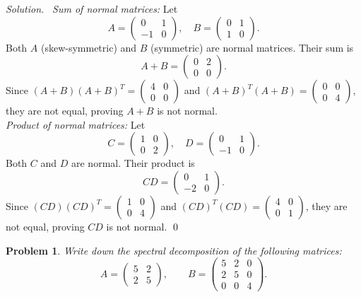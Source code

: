\documentclass[12pt,a4paper]{article}
\newenvironment{solution}{%
  \par\noindent\textit{Solution.}\ }{\qed}
\theoremstyle{problemstyle}
\newtheorem{problem}{Problem}[section]
\begin{document}
\begin{solution}
    \textit{Sum of normal matrices:} Let
\[ A = \begin{pmatrix} 0 & 1 \\ -1 & 0 \end{pmatrix}, \quad B = \begin{pmatrix} 0 & 1 \\ 1 & 0 \end{pmatrix}. \]
Both $A$ (skew-symmetric) and $B$ (symmetric) are normal matrices. Their sum is
\[ A+B = \begin{pmatrix} 0 & 2 \\ 0 & 0 \end{pmatrix}. \]
Since $(A+B)(A+B)^T = \begin{pmatrix} 4 & 0 \\ 0 & 0 \end{pmatrix}$ and $(A+B)^T(A+B) = \begin{pmatrix} 0 & 0 \\ 0 & 4 \end{pmatrix}$, they are not equal, proving $A+B$ is not normal.
\\ \textit{Product of normal matrices:} Let
\[ C = \begin{pmatrix} 1 & 0 \\ 0 & 2 \end{pmatrix}, \quad D = \begin{pmatrix} 0 & 1 \\ -1 & 0 \end{pmatrix}. \]
Both $C$ and $D$ are normal. Their product is
\[ CD = \begin{pmatrix} 0 & 1 \\ -2 & 0 \end{pmatrix}. \]
Since $(CD)(CD)^T = \begin{pmatrix} 1 & 0 \\ 0 & 4 \end{pmatrix}$ and $(CD)^T(CD) = \begin{pmatrix} 4 & 0 \\ 0 & 1 \end{pmatrix}$, they are not equal, proving $CD$ is not normal.
\end{solution}
\begin{problem}\label{prob:3-5}
Write down the spectral decomposition of the following matrices:
\[
A = \begin{pmatrix} 5 & 2 \\ 2 & 5 \end{pmatrix}, \qquad
B = \begin{pmatrix} 5 & 2 & 0 \\ 2 & 5 & 0 \\ 0 & 0 & 4 \end{pmatrix}.
\]
\end{problem}
\end{document}
